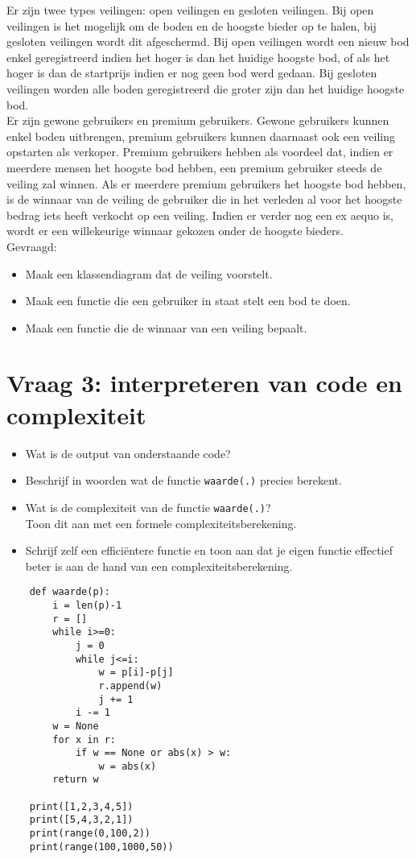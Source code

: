 \documentclass[kulak]{kulakarticle} %
\begin{document}
	Er zijn twee types veilingen: open veilingen en gesloten veilingen. Bij open veilingen is het mogelijk om de boden en de hoogste bieder op te halen, bij gesloten veilingen wordt dit afgeschermd. Bij open veilingen wordt een nieuw bod enkel geregistreerd indien het hoger is dan het huidige hoogste bod, of als het hoger is dan de startprijs indien er nog geen bod werd gedaan. Bij gesloten veilingen worden alle boden geregistreerd die groter zijn dan het huidige hoogste bod.\\

	Er zijn gewone gebruikers en premium gebruikers. Gewone gebruikers kunnen enkel boden uitbrengen, premium gebruikers kunnen daarnaast ook een veiling opstarten als verkoper. Premium gebruikers hebben als voordeel dat, indien er meerdere mensen het hoogste bod hebben, een premium gebruiker steeds de veiling zal winnen. Als er meerdere premium gebruikers het hoogste bod hebben, is de winnaar van de veiling de gebruiker die in het verleden al voor het hoogste bedrag iets heeft verkocht op een veiling. Indien er verder nog een ex aequo is, wordt er een willekeurige winnaar gekozen onder de hoogste bieders. \\

	Gevraagd:
	\begin{itemize}
		\item Maak een klassendiagram dat de veiling voorstelt.
		\item Maak een functie die een gebruiker in staat stelt een bod te doen.
		\item Maak een functie die de winnaar van een veiling bepaalt.
	\end{itemize}

	\newpage

	\section*{Vraag 3: interpreteren van code en complexiteit}

	\begin{itemize}
		\item Wat is de output van onderstaande code?
		\item Beschrijf in woorden wat de functie \texttt{waarde(.)} precies berekent.
		\item Wat is de complexiteit van de functie \texttt{waarde(.)}? \\Toon dit aan met een formele complexiteitsberekening.
		\item Schrijf zelf een efficiëntere functie en toon aan dat je eigen functie effectief beter is aan de hand van een complexiteitsberekening.
	\end{itemize}
	\hfill
	\begin{verbatim}
	def waarde(p):
	    i = len(p)-1
	    r = []
	    while i>=0:
	        j = 0
	        while j<=i:
	            w = p[i]-p[j]
	            r.append(w)
	            j += 1
	        i -= 1
	    w = None
	    for x in r:
	        if w == None or abs(x) > w:
	            w = abs(x)
	    return w

	print([1,2,3,4,5])
	print([5,4,3,2,1])
	print(range(0,100,2))
	print(range(100,1000,50))
	\end{verbatim}
\end{document}
